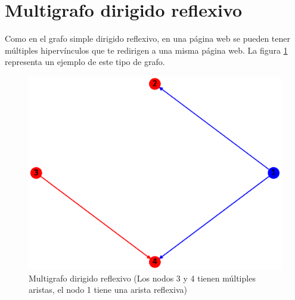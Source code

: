 \documentclass{article}
\begin{document}
\section{Multigrafo dirigido reflexivo}
Como en el grafo simple dirigido reflexivo, en una página web se pueden tener múltiples hipervínculos que te redirigen a una misma página web. La figura \ref{fig:MDR} representa un ejemplo de este tipo de grafo.
\begin{figure}[h!]
    \includegraphics[width=\textwidth]{12-MDR}
    \caption{Multigrafo dirigido reflexivo (Los nodos 3 y 4 tienen múltiples aristas, el nodo 1 tiene una arista reflexiva)}
    \label{fig:MDR}
\end{figure}









\end{document}
